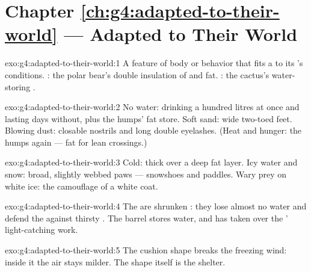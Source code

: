 \section*{Chapter \ref{ch:g4:adapted-to-their-world} --- Adapted to Their World}

\begin{solution}{exo:g4:adapted-to-their-world:1}
A feature of body or behavior that fits a  to its
's conditions. : the polar bear's double
insulation of  and fat. : the cactus's water-storing
.
\end{solution}

\begin{solution}{exo:g4:adapted-to-their-world:2}
No water: drinking a hundred litres at once and lasting days
without, plus the humps' fat store. Soft sand: wide two-toed
feet. Blowing dust: closable nostrils and long double
eyelashes. (Heat and hunger: the humps again --- fat for lean
crossings.)
\end{solution}

\begin{solution}{exo:g4:adapted-to-their-world:3}
Cold: thick  over a deep fat layer. Icy water and snow:
broad, slightly webbed paws --- snowshoes and paddles. Wary
prey on white ice: the camouflage of a white coat.
\end{solution}

\begin{solution}{exo:g4:adapted-to-their-world:4}
The  are shrunken : they lose almost no water and
defend the  against thirsty . The barrel 
stores water, and has taken over the ' light-catching
work.
\end{solution}

\begin{solution}{exo:g4:adapted-to-their-world:5}
The cushion shape breaks the freezing wind: inside it the air
stays milder. The shape itself is the shelter.
\end{solution}

